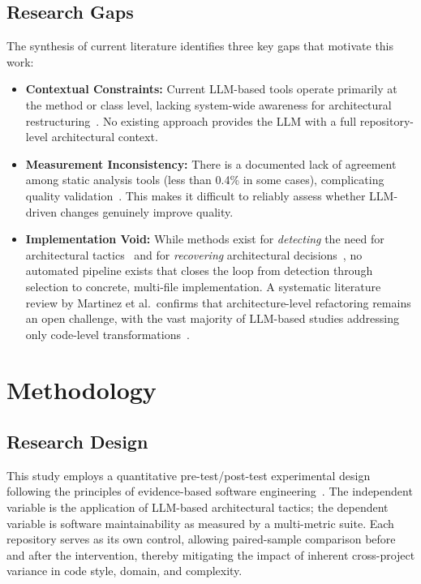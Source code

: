 \documentclass[sigconf,review,anonymous]{acmart}
\begin{document}
\subsection{Research Gaps}
The synthesis of current literature identifies three key gaps that motivate this work:
\begin{itemize}[nosep]
    \item \textbf{Contextual Constraints:} Current LLM-based tools operate primarily at the method or class level, lacking system-wide awareness for architectural restructuring~\cite{martinez2025refactoring, horikawa2025agentic}. No existing approach provides the LLM with a full repository-level architectural context.
    \item \textbf{Measurement Inconsistency:} There is a documented lack of agreement among static analysis tools (less than 0.4\% in some cases), complicating quality validation~\cite{lenarduzzi2023critical}. This makes it difficult to reliably assess whether LLM-driven changes genuinely improve quality.
    \item \textbf{Implementation Void:} While methods exist for \textit{detecting} the need for architectural tactics~\cite{marquez2022architectural} and for \textit{recovering} architectural decisions~\cite{shokri2024ipsynth}, no automated pipeline exists that closes the loop from detection through selection to concrete, multi-file implementation. A systematic literature review by Martinez et al.\ confirms that architecture-level refactoring remains an open challenge, with the vast majority of LLM-based studies addressing only code-level transformations~\cite{martinez2025refactoring}.
\end{itemize}

\section{Methodology}

\subsection{Research Design}
This study employs a quantitative pre-test/post-test experimental design following the principles of evidence-based software engineering~\cite{bass2021software}. The independent variable is the application of LLM-based architectural tactics; the dependent variable is software maintainability as measured by a multi-metric suite. Each repository serves as its own control, allowing paired-sample comparison before and after the intervention, thereby mitigating the impact of inherent cross-project variance in code style, domain, and complexity.
\end{document}
